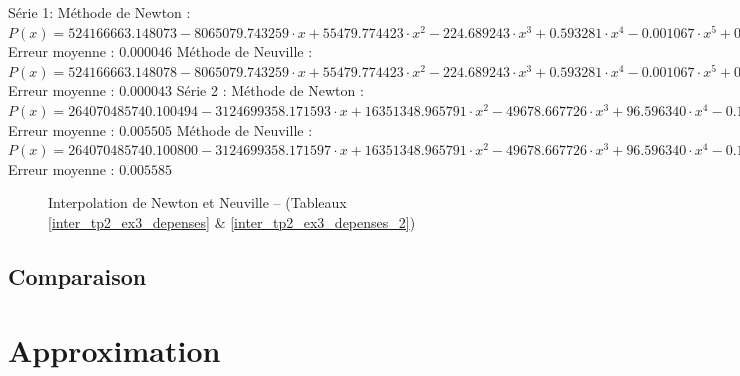 \documentclass{report}
\begin{document}
      Série 1:
      \newline
      Méthode de Newton : $P(x)= 524166663.148073-8065079.743259 \cdot x + 55479.774423 \cdot x^{2} - 224.689243 \cdot x^{3}  + 0.593281 \cdot x^{4} - 0.001067 \cdot x^{5}  + 0.01 \cdot x^{6} - 0.00 \cdot x^{7}  + 0.00 \cdot x^{8} - 0.00 \cdot x^{9}  + 0.00 \cdot x^{10} $
      \newline
      Erreur moyenne : $0.000046$
      \newline
      \newline
      Méthode de Neuville : $P(x)= 524166663.148078-8065079.743259 \cdot x + 55479.774423 \cdot x^{2} - 224.689243 \cdot x^{3}  + 0.593281 \cdot x^{4} - 0.001067 \cdot x^{5}  + 0.000001 \cdot x^{6} - 0 \cdot x^{7}  + 0 \cdot x^{8} - 0 \cdot x^{9}  + 0 \cdot x^{10} $
      \newline
      Erreur moyenne : $0.000043$
      \newline
      \newline
      \newline
      Série 2 :
      \newline
      Méthode de Newton : $P(x)= 264070485740.100494-3124699358.171593 \cdot x + 16351348.965791 \cdot x^{2} - 49678.667726 \cdot x^{3}  + 96.596340 \cdot x^{4} - 0.124686 \cdot x^{5}  + 0.000107 \cdot x^{6} - 0 \cdot x^{7}  + 0 \cdot x^{8} - 0 \cdot x^{9} $
      \newline
      Erreur moyenne : $0.005505$
      \newline
      \newline
      Méthode de Neuville : $P(x)= 264070485740.100800-3124699358.171597 \cdot x + 16351348.965791 \cdot x^{2} - 49678.667726 \cdot x^{3}  + 96.596340 \cdot x^{4} - 0.124686 \cdot x^{5}  + 0.000107 \cdot x^{6} - 0 \cdot x^{7}  + 0 \cdot x^{8} - 0 \cdot x^{9} $
      \newline
      Erreur moyenne : $0.005585$
      \newpage
      \begin{figure}[h]
	\centering
	\caption{Interpolation de Newton et Neuville -- (Tableaux \ref{inter_tp2_ex3_depenses} \& \ref{inter_tp2_ex3_depenses_2})}
      \end{figure}
    \newpage
    \section{Comparaison}
  \chapter{Approximation}
\end{document}
